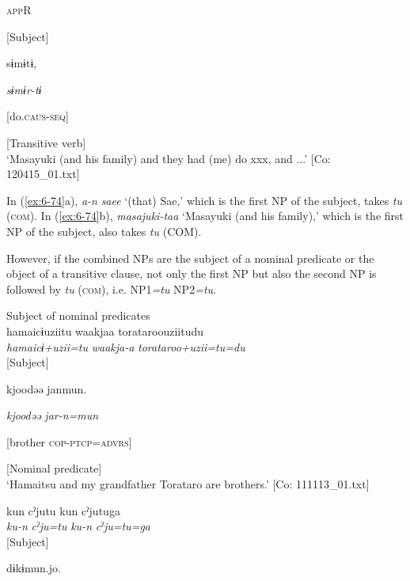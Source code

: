 \begin{table}
      [Masayuki-\textsc{pl}=\textsc{com}  \textsc{dist}-\textsc{nlz}-PL=\textsc{appr}=\textsc{nom}]    \textsc{app}R

      [Subject]    

      sɨmɨtɨ,

      \textit{sɨmɨr-tɨ}

      [do.\textsc{caus}-\textsc{seq}]

      [Transitive verb]\\
\glt ‘Masayuki (and his family) and they had (me) do xxx, and ...’ [Co: 120415\_01.txt]
\z

In (\ref{ex:6-74}a), \textit{a-n} \textit{saee} ‘(that) Sae,’ which is the first NP of the subject, takes \textit{tu} (\textsc{com}). In (\ref{ex:6-74}b), \textit{masajuki-taa} ‘Masayuki (and his family),’ which is the first NP of the subject, also takes \textit{tu} (COM).

  However, if the combined NPs are the subject of a nominal predicate or the object of a transitive clause, not only the first NP but also the second NP is followed by \textit{tu} (\textsc{com}), i.e. NP1\textit{=tu} NP2\textit{=tu}.

\ea\label{ex:6-75}
 Subject of nominal predicates\\

 \ea {\TM}  hamaicɨuziitu  waakjaa  torataroouziitudu\\
\glll \textit{hamaicɨ+uzii=tu}  \textit{waakja-a}  \textit{torataroo+uzii=tu=du}\\
[Hamaitsu+grandfather=\textsc{com}  1\textsc{pl}-\textsc{adnz}  Torataro+grandfather=COM=\textsc{foc}]

      [Subject]

      kjoodəə  janmun.

      \textit{kjoodəə}  \textit{jar-n=mun}

      [brother  \textsc{cop}-\textsc{ptcp}=\textsc{advrs}]

      [Nominal predicate]\\
\glt ‘Hamaitsu and my grandfather Torataro are brothers.’ [Co: 111113\_01.txt]
\z

\ex {\TM}  kun  cˀjutu  kun  cˀjutuga\\
\glll \textit{ku-n}  \textit{cˀju=tu}  \textit{ku-n}  \textit{cˀju=tu=ga}\\
[\textsc{prox}-\textsc{adnz}  person=\textsc{com}  PROX-\textsc{adnz}  person=COM]

      [Subject]

      dɨkɨmun.jo.


\end{table}
